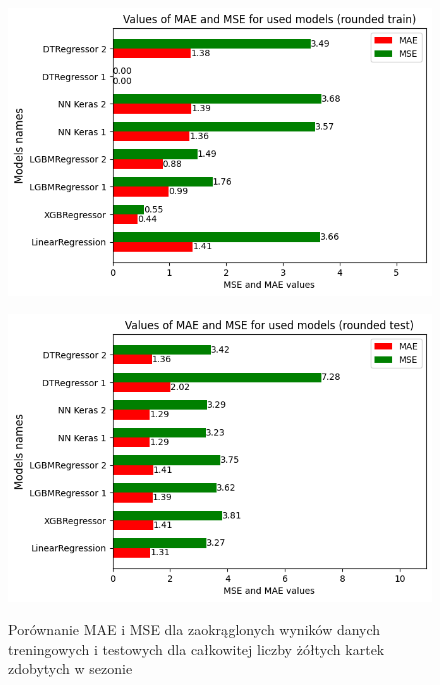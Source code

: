 \documentclass{article}
\begin{document}
\begin{figure}[H]
  \centering
  \begin{minipage}[b]{0.5\textwidth}
    \centering
    \includegraphics[width=\textwidth]{all_errors_9.png}
    \label{fig:all_errors_9}
  \end{minipage}%
  \begin{minipage}[b]{0.5\textwidth}
    \centering
    \includegraphics[width=\textwidth]{all_errors_10.png}
    \label{fig:all_errors_10}
  \end{minipage}
  \captionsetup{justification=centering}
  \caption{Porównanie MAE i MSE dla zaokrąglonych wyników danych treningowych i testowych dla całkowitej liczby żółtych kartek zdobytych w sezonie}
  \label{fig:all_errors_3_1}
\end{figure}
\end{document}
